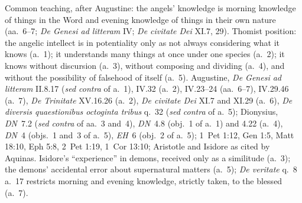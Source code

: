  {Common teaching, after Augustine: the angels' knowledge is morning
 knowledge of things in the Word and evening knowledge of things in their
 own nature (aa.~6--7; \emph{De Genesi ad litteram} IV; \emph{De civitate
 Dei} XI.7, 29). Thomist position: the angelic intellect is in
 potentiality only as not always considering what it knows (a.~1); it
 understands many things at once under one species (a.~2); it knows
 without discursion (a.~3), without composing and dividing (a.~4), and
 without the possibility of falsehood of itself (a.~5).}
 {Augustine, \emph{De Genesi ad litteram} II.8.17 (\emph{sed contra} of
 a.~1), IV.32 (a.~2), IV.23--24 (aa.~6--7), IV.29.46 (a.~7), \emph{De
 Trinitate} XV.16.26 (a.~2), \emph{De civitate Dei} XI.7 and XI.29 (a.~6),
 \emph{De diversis quaestionibus octoginta tribus} q.~32 (\emph{sed
 contra} of a.~5); Dionysius, \emph{DN}~7.2 (\emph{sed contra} of aa.~3
 and~4), \emph{DN}~4.8 (obj.~1 of a.~1) and 4.22 (a.~4), \emph{DN}~4
 (objs.~1 and~3 of a.~5), \emph{EH}~6 (obj.~2 of a.~5); 1~Pet 1:12, Gen
 1:5, Matt 18:10, Eph 5:8, 2~Pet 1:19, 1~Cor 13:10; Aristotle and Isidore
 as cited by Aquinas.}
 {Isidore's ``experience'' in demons, received only as a similitude
 (a.~3); the demons' accidental error about supernatural matters (a.~5);
 \emph{De veritate} q.~8 a.~17 restricts morning and evening knowledge,
 strictly taken, to the blessed (a.~7).}
